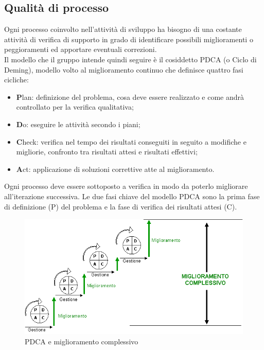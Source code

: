 \documentclass[a4paper,11pt]{article}
\begin{document}
\subsection{Qualità di processo}

Ogni processo coinvolto nell'attività di sviluppo ha bisogno di una costante attività di verifica di supporto in grado di identificare possibili miglioramenti o peggioramenti ed apportare eventuali correzioni. \\
Il modello che il gruppo intende quindi seguire è il cosiddetto PDCA (o Ciclo di Deming), modello volto al miglioramento continuo che definisce quattro fasi cicliche:
\begin{itemize}
\item \textbf{P}lan: definizione del problema, cosa deve essere realizzato e come andrà controllato per la verifica qualitativa;
\item \textbf{D}o: eseguire le attività secondo i piani;
\item \textbf{C}heck: verifica nel tempo dei risultati conseguiti in seguito a modifiche e migliorie, confronto tra risultati attesi e risultati effettivi; %
\item \textbf{A}ct: applicazione di soluzioni correttive atte al miglioramento.
\end{itemize}
Ogni processo deve essere sottoposto a verifica in modo da poterlo migliorare all'iterazione successiva. 
Le due fasi chiave del modello PDCA sono la prima fase di definizione (P) del problema e la fase di verifica dei risultati attesi (C). 
\begin{figure}[h!]
\centering
\includegraphics[scale=0.6]{../images/PDCA}
\caption{PDCA e miglioramento complessivo}
\end{figure}
\end{document}
